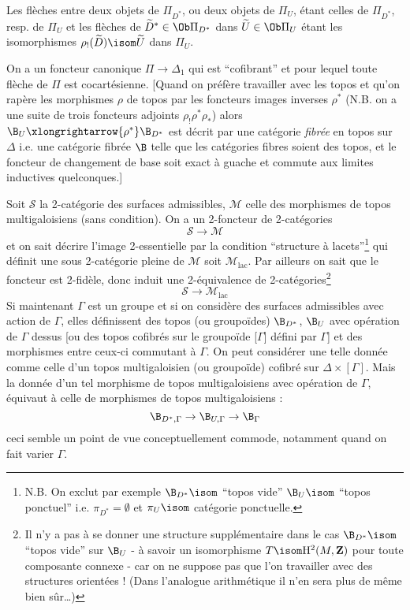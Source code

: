 Les flèches entre deux objets de $\Pi_{D^*}$, ou deux objets de $\Pi_U$, étant celles de $\Pi_{D^*}$, resp. de $\Pi_U$ et les flèches de $\widetilde{D}^* \in \Ob \Pi_{D^*}$ dans $\widetilde{U} \in \Ob \Pi_U$ étant les isomorphismes $\rho_!(\widetilde{D}) \isom \widetilde{U}$ dans $\Pi_U$.

On a un foncteur canonique $\Pi \to \Delta_1$ qui est ``cofibrant'' et pour lequel toute flèche de $\Pi$ est cocartésienne. [Quand on préfère travailler avec les topos et qu'on rapère les morphismes $\rho$ de topos par les foncteurs images inverses $\rho^*$ (N.B. on a une suite de trois foncteurs adjoints $\rho_! \rho^* \rho_*$) alors $\B_U \xlongrightarrow{\rho^*} \B_{D^*}$ est décrit par une catégorie \emph{fibrée} en topos sur $\Delta$ i.e. une catégorie fibrée $\B$ telle que les catégories fibres soient des topos, et le foncteur de changement de base soit exact à guache et commute aux limites inductives quelconques.]

Soit $\mathscr{S}$ la 2-catégorie des surfaces admissibles, $\mathscr{M}$ celle des morphismes de topos multigaloisiens (sans condition). On a un 2-foncteur de 2-catégories
$$
\mathscr{S} \to \mathscr{M}
$$
et on sait décrire l'image 2-essentielle par la condition ``structure à lacets''\footnote{N.B. On exclut par exemple $\B_{D^*} \isom$ ``topos vide'' $\B_U \isom$ ``topos ponctuel'' i.e. $\pi_{D^*} = \emptyset$ et $\pi_U \isom$ catégorie ponctuelle.} qui définit une sous 2-catégorie pleine de $\mathscr{M}$ soit $\mathscr{M}_{\text{lac}}$. Par ailleurs on sait que le foncteur est 2-fidèle, donc induit une 2-équivalence de 2-catégories\footnote{Il n'y a pas à se donner une structure supplémentaire dans le cas $\B_{D^*} \isom$ ``topos vide'' sur $\B_U$ - à savoir un isomorphisme $T \isom \mathrm{H}^2(M, \mathbf{Z})$ pour toute composante connexe - car on ne suppose pas que l'on travailler avec des structures orientées ! (Dans l'analogue arithmétique il n'en sera plus de   même bien sûr\dots)}
$$
\mathscr{S} \to \mathscr{M}_{\text{lac}}
$$
Si maintenant $\Gamma$ est un groupe et si on considère des surfaces admissibles avec action de $\Gamma$, elles définissent des topos (ou groupoïdes) $\B_{D^*}$, $\B_U$ avec opération de $\Gamma$ dessus [ou des topos cofibrés sur le groupoïde [$\Gamma$] défini par $\Gamma$] et des morphismes entre ceux-ci commutant à $\Gamma$. On peut considérer une telle donnée comme celle d'un topos multigaloisien (ou groupoïde) cofibré sur $\Delta \times [\Gamma]$. Mais la donnée d'un tel morphisme de topos multigaloisiens avec opération de $\Gamma$, équivaut à celle de morphismes de topos multigaloisiens :
$$
\B_{D^*, \Gamma} \to \B_{U, \Gamma} \to \B_{\Gamma}
$$
ceci semble un point de vue conceptuellement commode, notamment quand on fait varier $\Gamma$.

